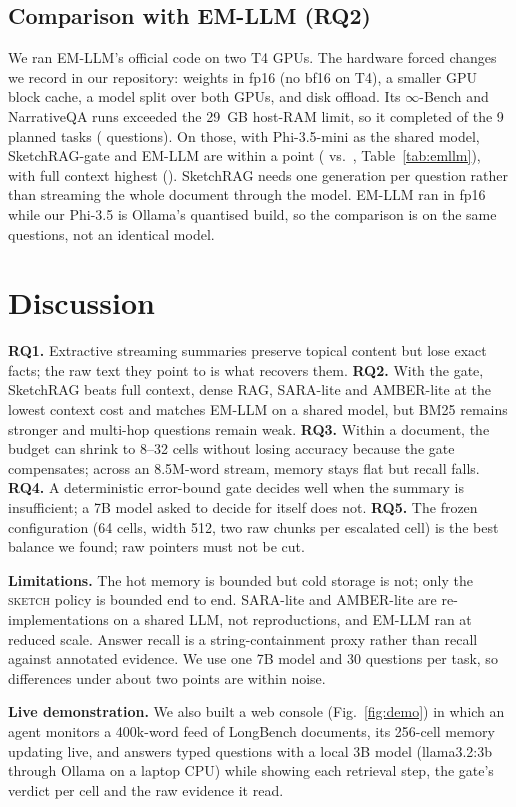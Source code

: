 \documentclass[conference,10pt]{IEEEtran}
\newcommand{\sys}[1]{\textsc{#1}}
\begin{document}
\subsection{Comparison with EM-LLM (RQ2)}

We ran EM-LLM's official code on two T4 GPUs. The hardware forced changes we record in our repository: weights in fp16
(no bf16 on T4), a smaller GPU block cache, a model split over both GPUs, and disk offload. Its $\infty$-Bench and
NarrativeQA runs exceeded the 29~GB host-RAM limit, so it completed \EMTasks{} of the 9 planned tasks (\EMQ{} questions).
On those, with Phi-3.5-mini as the shared model, SketchRAG-gate and EM-LLM are within a point (\EMGate{} vs.\ \EMLLM{},
Table~\ref{tab:emllm}), with full context highest (\EMFull{}). SketchRAG needs one generation per question rather than
streaming the whole document through the model. EM-LLM ran in fp16 while our Phi-3.5 is Ollama's quantised build, so
the comparison is on the same questions, not an identical model.

\section{Discussion}
\textbf{RQ1.} Extractive streaming summaries preserve topical content but lose exact facts; the raw text they point to
is what recovers them. \textbf{RQ2.} With the gate, SketchRAG beats full context, dense RAG, SARA-lite and AMBER-lite at
the lowest context cost and matches EM-LLM on a shared model, but BM25 remains stronger and multi-hop questions remain
weak. \textbf{RQ3.} Within a document, the budget can shrink to 8--32 cells without losing accuracy because the gate
compensates; across an 8.5M-word stream, memory stays flat but recall falls. \textbf{RQ4.} A deterministic
error-bound gate decides well when the summary is insufficient; a 7B model asked to decide for itself does not.
\textbf{RQ5.} The frozen configuration (64 cells, width 512, two raw chunks per escalated cell) is the best balance we
found; raw pointers must not be cut.

\textbf{Limitations.} The hot memory is bounded but cold storage is not; only the \sys{sketch} policy is bounded end to
end. SARA-lite and AMBER-lite are re-implementations on a shared LLM, not reproductions, and EM-LLM ran at reduced scale.
Answer recall is a string-containment proxy rather than recall against annotated evidence. We use one 7B model and 30
questions per task, so differences under about two points are within noise.

\textbf{Live demonstration.} We also built a web console (Fig.~\ref{fig:demo}) in which an agent monitors a
400k-word feed of LongBench documents, its 256-cell memory updating live, and answers typed questions with a local 3B
model (llama3.2:3b through Ollama on a laptop CPU) while showing each retrieval step, the gate's verdict per cell and the
raw evidence it read.
\end{document}
